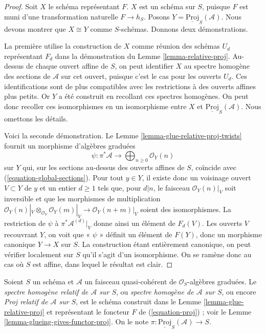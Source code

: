 \begin{proof}
Soit $X$ le schéma représentant $F$.
$X$ est un schéma sur $S$, puisque $F$
est muni d'une transformation naturelle $F \to h_S$.
Posons $Y = \underline{\text{Proj}}_S(\mathcal{A})$.
Nous devons montrer
que $X \cong Y$ comme $S$-schémas. Donnons deux démonstrations.

\medskip\noindent
La première utilise la construction de $X$ comme réunion des schémas $U_d$
représentant $F_d$ dans la démonstration
du Lemme \ref{lemma-relative-proj}.
Au-dessus de chaque ouvert affine de $S$, on peut identifier $X$ au spectre
homogène des sections de $\mathcal{A}$
sur cet ouvert, puisque c'est le cas
pour les ouverts $U_d$. Ces identifications sont de plus compatibles avec
les restrictions à des ouverts affines plus petits. Or $Y$ a été construit
en recollant ces spectres homogènes. On
peut donc recoller ces isomorphismes
en un isomorphisme entre $X$ et $\underline{\text{Proj}}_S(\mathcal{A})$.
Nous omettons les détails.

\medskip\noindent
Voici la seconde démonstration. Le
Lemme \ref{lemma-glue-relative-proj-twists} fournit un morphisme d'algèbres
graduées
$$
\psi : \pi^*\mathcal{A}
\longrightarrow
\bigoplus\nolimits_{n \geq 0} \mathcal{O}_Y(n)
$$
sur $Y$ qui, sur les sections au-dessus des ouverts affines de $S$, coïncide
avec (\ref{equation-global-sections}). Pour tout $y \in Y$, il existe donc
un voisinage ouvert $V \subset Y$ de $y$ et un entier $d \geq 1$ tels que,
pour $d | n$, le faisceau $\mathcal{O}_Y(n)|_V$ soit inversible et que les
morphismes de multiplication
$\mathcal{O}_Y(n)|_V \otimes_{\mathcal{O}_V} \mathcal{O}_Y(m)|_V
\to \mathcal{O}_Y(n + m)|_V$ soient des isomorphismes.
La restriction de $\psi$ à $\pi^*\mathcal{A}^{(d)}|_V$ donne ainsi un
élément de $F_d(V)$. Les ouverts $V$ recouvrant $Y$, on voit que « $\psi$ »
définit un élément de $F(Y)$, donc un
morphisme canonique $Y \to X$ sur $S$.
La construction étant entièrement canonique, on peut vérifier localement
sur $S$ qu'il s'agit d'un isomorphisme. On se ramène donc au cas où $S$ est
affine, dans lequel le résultat est clair.
\end{proof}

\begin{definition}
\label{definition-relative-proj}
Soient $S$ un schéma et $\mathcal{A}$ un faisceau quasi-cohérent de
$\mathcal{O}_S$-algèbres graduées. Le {\it spectre homogène relatif de
$\mathcal{A}$ sur $S$}, ou {\it spectre
homogène de $\mathcal{A}$ sur $S$},
ou encore {\it Proj relatif de $\mathcal{A}$ sur $S$}, est le schéma
construit dans le Lemme \ref{lemma-glue-relative-proj} et représentant le
foncteur $F$ de (\ref{equation-proj}) ; voir le
Lemme \ref{lemma-glueing-gives-functor-proj}.
On le note $\pi : \underline{\text{Proj}}_S(\mathcal{A}) \to S$.
\end{definition}

